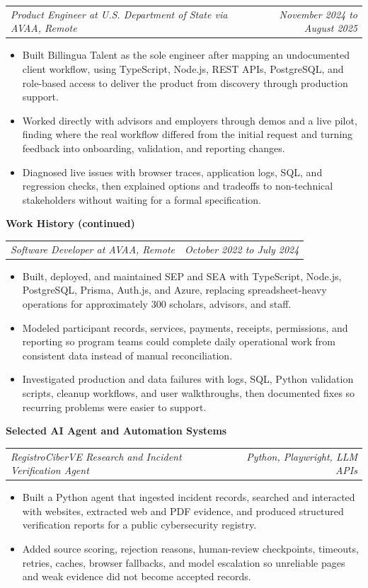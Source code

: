 \documentclass[10pt,letterpaper]{article}
\makeatletter
\newcommand{\bodyfont}{\fontsize{10.5}{15.75}\selectfont}
\newcommand{\sectiontitle}[1]{%
  \vspace{4pt}
  {\bodyfont\textbf{#1}}\par
  \nopagebreak[4]
  \vspace{2pt}
}
\newcommand{\roleline}[2]{%
  \begin{tabularx}{\textwidth}{@{}Xr@{}}
    \bodyfont\textit{#1} & \bodyfont\textit{#2}
  \end{tabularx}
  \nopagebreak[4]
  \vspace{1pt}
}
\makeatother
\begin{document}
\vspace{3pt}
\roleline{Product Engineer at U.S. Department of State via AVAA, Remote}{November 2024 to August 2025}
\begin{itemize}
  \item Built Billingua Talent as the sole engineer after mapping an undocumented client workflow, using TypeScript, Node.js, REST APIs, PostgreSQL, and role-based access to deliver the product from discovery through production support.
  \item Worked directly with advisors and employers through demos and a live pilot, finding where the real workflow differed from the initial request and turning feedback into onboarding, validation, and reporting changes.
  \item Diagnosed live issues with browser traces, application logs, SQL, and regression checks, then explained options and tradeoffs to non-technical stakeholders without waiting for a formal specification.
\end{itemize}

\newpage
\sectiontitle{Work History (continued)}

\roleline{Software Developer at AVAA, Remote}{October 2022 to July 2024}
\begin{itemize}
  \item Built, deployed, and maintained SEP and SEA with TypeScript, Node.js, PostgreSQL, Prisma, Auth.js, and Azure, replacing spreadsheet-heavy operations for approximately 300 scholars, advisors, and staff.
  \item Modeled participant records, services, payments, receipts, permissions, and reporting so program teams could complete daily operational work from consistent data instead of manual reconciliation.
  \item Investigated production and data failures with logs, SQL, Python validation scripts, cleanup workflows, and user walkthroughs, then documented fixes so recurring problems were easier to support.
\end{itemize}

\sectiontitle{Selected AI Agent and Automation Systems}

\roleline{RegistroCiberVE Research and Incident Verification Agent}{Python, Playwright, LLM APIs}
\begin{itemize}
  \item Built a Python agent that ingested incident records, searched and interacted with websites, extracted web and PDF evidence, and produced structured verification reports for a public cybersecurity registry.
  \item Added source scoring, rejection reasons, human-review checkpoints, timeouts, retries, caches, browser fallbacks, and model escalation so unreliable pages and weak evidence did not become accepted records.
\end{itemize}
\end{document}
